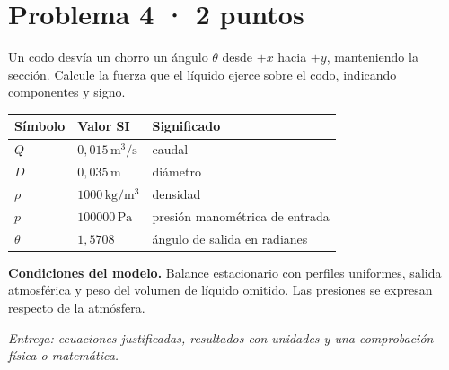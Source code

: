 \par\medskip\noindent\begin{minipage}{\linewidth}

\section{Problema 4 · 2 puntos}

Un codo desvía un chorro un ángulo $\theta$ desde $+x$ hacia $+y$, manteniendo la sección. Calcule la fuerza que el líquido ejerce sobre el codo, indicando componentes y signo.

\begin{tabular}{@{}p{.15\linewidth}p{.23\linewidth}p{.54\linewidth}@{}}
\toprule Símbolo & Valor SI & Significado\\\midrule
$Q$ & $0{,}015\,\mathrm{m^3/s}$ & caudal\\
$D$ & $0{,}035\,\mathrm{m}$ & diámetro\\
$\rho$ & $1000\,\mathrm{kg/m^3}$ & densidad\\
$p$ & $100000\,\mathrm{Pa}$ & presión manométrica de entrada\\
$\theta$ & $1{,}5708$ & ángulo de salida en radianes\\
\bottomrule\end{tabular}

\par\medskip\textbf{Condiciones del modelo.} Balance estacionario con perfiles uniformes, salida atmosférica y peso del volumen de líquido omitido. Las presiones se expresan respecto de la atmósfera.

\par\textit{Entrega: ecuaciones justificadas, resultados con unidades y una comprobación física o matemática.}

\end{minipage}\par\medskip

